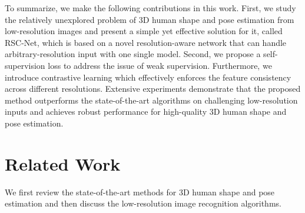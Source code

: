 \documentclass[runningheads]{llncs}
\newcommand{\netname}{RSC-Net}
\begin{document}
To summarize, we make the following contributions in this work.
First, we study the relatively unexplored problem of 3D human shape and pose estimation from low-resolution images and present a simple yet effective solution for it, called \netname{}, which is based on a novel resolution-aware network that can handle arbitrary-resolution input with one single model. 
Second, we propose a self-supervision loss to address the issue of weak supervision.
Furthermore, we introduce contrastive learning  which effectively enforces the feature consistency across different resolutions.
Extensive experiments demonstrate that the proposed method outperforms the state-of-the-art algorithms on challenging low-resolution inputs and achieves robust performance for high-quality 3D human shape and pose estimation.





\section{Related Work}


We first review the state-of-the-art methods for 3D human shape and pose estimation and then discuss the low-resolution image recognition algorithms.
\end{document}
